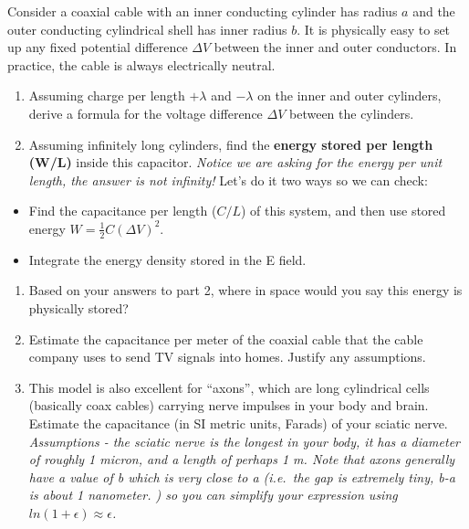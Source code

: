 \documentclass[11pt]{article}
\def\tightlist{}
\begin{document}
Consider a coaxial cable with an inner conducting cylinder has radius
\(a\) and the outer conducting cylindrical shell has inner radius \(b\).
It is physically easy to set up any fixed potential difference
\(\Delta V\) between the inner and outer conductors. In practice, the
cable is always electrically neutral.

\begin{enumerate}
\def\labelenumi{\arabic{enumi}.}
\tightlist
\item
  Assuming charge per length \(+\lambda\) and \(-\lambda\) on the inner
  and outer cylinders, derive a formula for the voltage difference
  \(\Delta V\) between the cylinders.
\item
  Assuming infinitely long cylinders, find the \textbf{energy stored per
  length (W/L)} inside this capacitor. \emph{Notice we are asking for
  the energy per unit length, the answer is not infinity!} Let's do it
  two ways so we can check:
\end{enumerate}

\begin{itemize}
\tightlist
\item
  Find the capacitance per length (\(C/L\)) of this system, and then use
  stored energy \(W = \frac{1}{2} C (\Delta V)^2\).
\item
  Integrate the energy density stored in the E field.
\end{itemize}

\begin{enumerate}
\def\labelenumi{\arabic{enumi}.}
\setcounter{enumi}{2}
\tightlist
\item
  Based on your answers to part 2, where in space would you say this
  energy is physically stored?
\item
  Estimate the capacitance per meter of the coaxial cable that the cable
  company uses to send TV signals into homes. Justify any assumptions.
\item
  This model is also excellent for ``axons'', which are long cylindrical
  cells (basically coax cables) carrying nerve impulses in your body and
  brain. Estimate the capacitance (in SI metric units, Farads) of your
  sciatic nerve. \emph{Assumptions - the sciatic nerve is the longest in
  your body, it has a diameter of roughly 1 micron, and a length of
  perhaps 1 m. Note that axons generally have a value of b which is very
  close to a (i.e.~the gap is extremely tiny, b-a is about 1 nanometer.
  ) so you can simplify your expression using
  \(ln(1+\epsilon)\approx\epsilon\).}
\end{enumerate}
\end{document}
